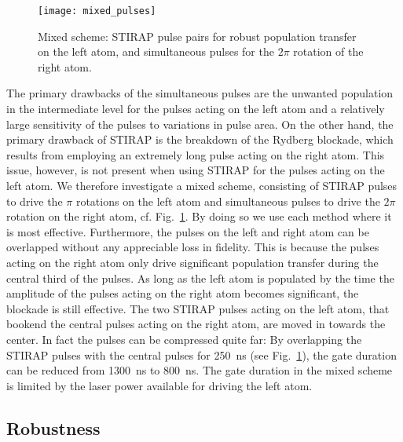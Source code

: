 \begin{figure}[tb]
  \begin{center}
    \texttt{[image: mixed\_pulses]}
  \end{center}
  \caption{%
    Mixed scheme: STIRAP pulse pairs for robust population
    transfer on the left atom, and simultaneous pulses for the $2\pi$
    rotation of the right atom.
  }
  \label{fig:mixed}
\end{figure}
The primary drawbacks of the simultaneous pulses are the
unwanted population in the intermediate level for the pulses acting on
the left atom and a relatively large sensitivity of
the pulses to variations in pulse area.
On the other hand, the primary drawback
of STIRAP is the breakdown of the Rydberg blockade, which
results from employing an extremely long  pulse acting on the right
atom. This issue, however, is  not present when using STIRAP for the
pulses acting on the left atom. We therefore investigate a mixed
scheme, consisting of STIRAP pulses to drive the $\pi$ rotations on
the left atom and simultaneous pulses to drive the $2\pi$ rotation on
the right atom, cf. Fig.~\ref{fig:mixed}. By doing so we
use each method where it is most effective.
Furthermore, the pulses on the left and right atom can be overlapped
without any appreciable loss in fidelity. This is because the
pulses acting on the right atom only drive significant population
transfer during the central third of the pulses. As long as the left
atom is populated by the time the amplitude of the pulses acting on
the right atom becomes significant, the blockade is still effective. The two
STIRAP pulses acting on the left atom, that bookend the central pulses
acting on the right atom, are moved in towards the center.
In fact the pulses can be compressed
quite far: By overlapping the STIRAP pulses
with the central pulses for \SI{250}{ns} (see Fig.~\ref{fig:mixed}),
the gate duration can be
reduced from \SI{1300}{ns} to \SI{800}{ns}. The gate duration in the mixed scheme is
limited by the laser power available for driving the left atom.

\subsection{Robustness}
\label{subsec:RydRobust}

